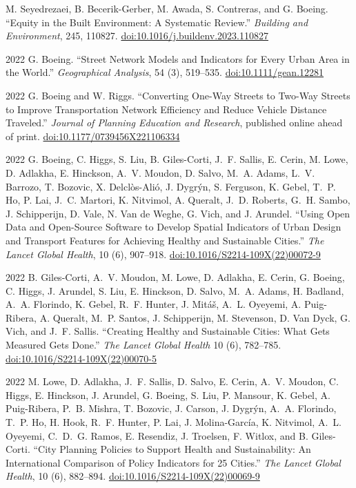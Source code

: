 \documentclass[11pt,letterpaper]{report}
\begin{document}
\begin{tablist}
        \item[\the\year] \tab{}M. Seyedrezaei, B. Becerik-Gerber, M. Awada, S. Contreras, and G. Boeing. \enquote{Equity in the Built Environment: A Systematic Review.} \textit{Building and Environment}, 245, 110827. \href{https://doi.org/10.1016/j.buildenv.2023.110827}{doi:10.1016/j.buildenv.2023.110827}

        \item[2022] \tab{}G. Boeing. \enquote{Street Network Models and Indicators for Every Urban Area in the World.} \textit{Geographical Analysis}, 54 (3), 519--535. \href{https://doi.org/10.1111/gean.12281}{doi:10.1111/gean.12281}

        \item[2022] \tab{}G. Boeing and W. Riggs. \enquote{Converting One-Way Streets to Two-Way Streets to Improve Transportation Network Efficiency and Reduce Vehicle Distance Traveled.} \textit{Journal of Planning Education and Research}, published online ahead of print. \href{https://doi.org/10.1177/0739456X221106334}{doi:10.1177/0739456X221106334}

        \item[2022] \tab{}G. Boeing, C. Higgs, S. Liu, B. Giles-Corti, J.~F. Sallis, E. Cerin, M. Lowe, D. Adlakha, E. Hinckson, A.~V. Moudon, D. Salvo, M.~A. Adams, L.~V. Barrozo, T. Bozovic, X. Delclòs-Alió, J. Dygrýn, S. Ferguson, K. Gebel, T.~P. Ho, P. Lai, J.~C. Martori, K. Nitvimol, A. Queralt, J.~D. Roberts, G.~H. Sambo, J. Schipperijn, D. Vale, N. Van de Weghe, G. Vich, and J. Arundel. \enquote{Using Open Data and Open-Source Software to Develop Spatial Indicators of Urban Design and Transport Features for Achieving Healthy and Sustainable Cities.} \textit{The Lancet Global Health}, 10 (6), 907--918. \href{https://doi.org/10.1016/S2214-109X(22)00072-9}{doi:10.1016/S2214-109X(22)00072-9}

        \item[2022] \tab{}B. Giles-Corti, A.~V. Moudon, M. Lowe, D. Adlakha, E. Cerin, G. Boeing, C. Higgs, J. Arundel, S. Liu, E. Hinckson, D. Salvo, M.~A. Adams, H. Badland, A.~A. Florindo, K. Gebel, R.~F. Hunter, J. Mitáš, A.~L. Oyeyemi, A. Puig-Ribera, A. Queralt, M.~P. Santos, J. Schipperijn, M. Stevenson, D. Van Dyck, G. Vich, and J.~F. Sallis. \enquote{Creating Healthy and Sustainable Cities: What Gets Measured Gets Done.} \textit{The Lancet Global Health} 10 (6), 782--785. \href{https://doi.org/10.1016/S2214-109X(22)00070-5}{doi:10.1016/S2214-109X(22)00070-5}

        \item[2022] \tab{}M. Lowe, D. Adlakha, J.~F. Sallis, D. Salvo, E. Cerin, A.~V. Moudon, C. Higgs, E. Hinckson, J. Arundel, G. Boeing, S. Liu, P. Mansour, K. Gebel, A. Puig-Ribera, P.~B. Mishra, T. Bozovic, J. Carson, J. Dygrýn, A.~A. Florindo, T.~P. Ho, H. Hook, R.~F. Hunter, P. Lai, J. Molina-García, K. Nitvimol, A.~L. Oyeyemi, C.~D.~G. Ramos, E. Resendiz, J. Troelsen, F. Witlox, and B. Giles-Corti. \enquote{City Planning Policies to Support Health and Sustainability: An International Comparison of Policy Indicators for 25 Cities.}  \textit{The Lancet Global Health}, 10 (6), 882--894. \href{https://doi.org/10.1016/S2214-109X(22)00069-9}{doi:10.1016/S2214-109X(22)00069-9}


\end{tablist}
\end{document}
